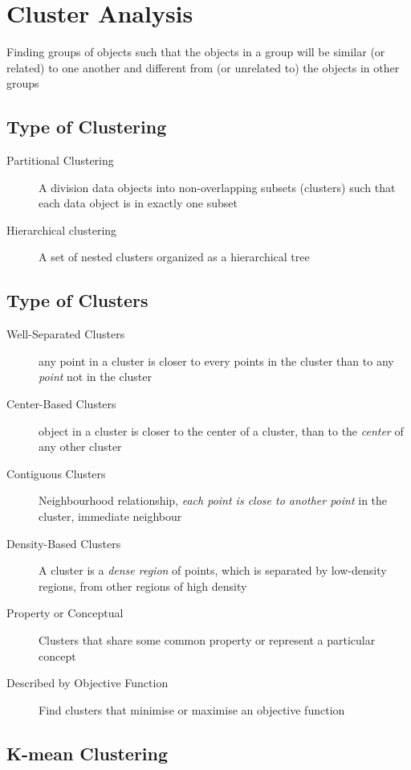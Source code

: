 \chapter{Cluster Analysis}

Finding groups of objects such that the objects in a group will be similar (or related) to one another and different from (or
unrelated to) the objects in other groups

\section{Type of Clustering}

\begin{description}
\item[Partitional Clustering] A division data objects into non-overlapping subsets (clusters) such that each data object is in exactly one subset
\item[Hierarchical clustering] A set of nested clusters organized as a hierarchical tree
\end{description}

\section{Type of Clusters}

\begin{description}
\item[Well-Separated Clusters] any point in a cluster is closer to every points in the cluster than to any \emph{point} not in the cluster
\item[Center-Based Clusters] object in a cluster is closer to the center of a cluster, than to the \emph{center} of any other cluster
\item[Contiguous Clusters] Neighbourhood relationship, \emph{each point is close to another point} in the cluster, immediate neighbour
\item[Density-Based Clusters] A cluster is a \emph{dense region} of points, which is separated by low-density regions, from other regions of high density
\item[Property or Conceptual] Clusters that share some common property or represent a particular concept
\item[Described by Objective Function] Find clusters that minimise or maximise an objective function
\end{description}
\section{K-mean Clustering}

